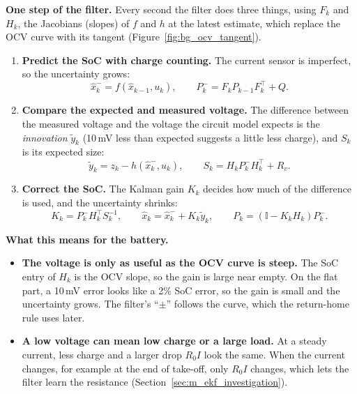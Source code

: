 \label{sec:bg_kf_loop}\label{sec:bg_ekf}\label{eq:bg_kf_s}\label{eq:bg_kf_pupd}\label{eq:bg_jacobians}\textbf{One step of the filter.} Every second the filter does three things, using $F_k$ and $H_k$, the Jacobians (slopes) of $f$ and $h$ at the latest estimate, which replace the OCV curve with its tangent (Figure~\ref{fig:bg_ocv_tangent}).
\begin{enumerate}
  \item \textbf{Predict the SoC with charge counting.} The current sensor is imperfect, so the uncertainty grows:
  \begin{equation}
    \hat{x}_k^- = f(\hat{x}_{k-1}, u_k), \qquad P_k^- = F_k P_{k-1} F_k^{\top} + Q.
    \label{eq:bg_kf_ppred}
  \end{equation}
  \item \textbf{Compare the expected and measured voltage.} The difference between the measured voltage and the voltage the circuit model expects is the \emph{innovation} $\tilde{y}_k$ (10\,mV less than expected suggests a little less charge), and $S_k$ is its expected size:
  \begin{equation}
    \tilde{y}_k = z_k - h(\hat{x}_k^-, u_k), \qquad S_k = H_k P_k^- H_k^{\top} + R_v.
    \label{eq:bg_kf_innov}
  \end{equation}
  \item \textbf{Correct the SoC.} The Kalman gain $K_k$ decides how much of the difference is used, and the uncertainty shrinks:
  \begin{equation}
    K_k = P_k^- H_k^{\top} S_k^{-1}, \qquad \hat{x}_k = \hat{x}_k^- + K_k \tilde{y}_k, \qquad P_k = (\mathbb{I} - K_k H_k) P_k^- .
    \label{eq:bg_kf_xupd}
  \end{equation}
\end{enumerate}

\label{sec:bg_gain}\textbf{What this means for the battery.}
\begin{itemize}
  \item \textbf{The voltage is only as useful as the OCV curve is steep.} The SoC entry of $H_k$ is the OCV slope, so the gain is large near empty. On the flat part, a 10\,mV error looks like a 2\% SoC error, so the gain is small and the uncertainty grows. The filter's ``$\pm$'' follows the curve, which the return-home rule uses later.
  \item \textbf{A low voltage can mean low charge or a large load.} At a steady current, less charge and a larger drop $R_0 I$ look the same. When the current changes, for example at the end of take-off, only $R_0 I$ changes, which lets the filter learn the resistance (Section~\ref{sec:m_ekf_investigation}).
\end{itemize}
